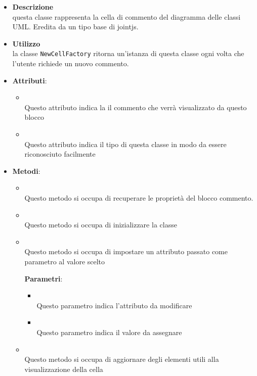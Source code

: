 \label{\nogloxy{swedesigner::client::model::celltypes::class::HxComment}}
\begin{itemize}
\item \textbf{Descrizione}\\
questa classe rappresenta la cella di commento del diagramma delle classi UML. Eredita da un tipo base di jointjs.
\item \textbf{Utilizzo}\\
la classe \texttt{NewCellFactory} ritorna un'istanza di questa classe ogni volta che l'utente richiede un nuovo commento.
\item \textbf{Attributi}:
\begin{itemize}
\item {}
\\ Questo attributo indica la il commento che verrà visualizzato da questo blocco
\item {}
\\ Questo attributo indica il tipo di questa classe in modo da essere riconosciuto facilmente
\end{itemize}
\item \textbf{Metodi}:
\begin{itemize}
\item {}
\\ Questo metodo si occupa di recuperare le proprietà del blocco commento.
\item {}
\\ Questo metodo si occupa di inizializzare la classe

\item {}
\\ Questo metodo si occupa di impostare un attributo passato come parametro al valore scelto

\textbf{Parametri}:
\begin{itemize}
\item {}
\\ Questo parametro indica l'attributo da modificare

\item {}
\\ Questo parametro indica il valore da assegnare

\end{itemize}
\item {}
\\ Questo metodo si occupa di aggiornare degli elementi utili alla visualizzazione della cella

\end{itemize}
\end{itemize}

